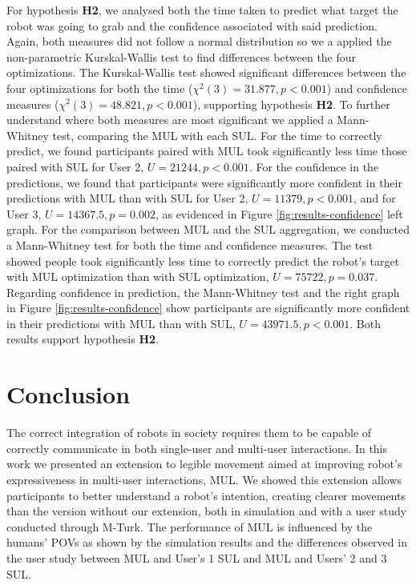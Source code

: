 \documentclass[letterpaper, 10 pt, conference]{ieeeconf}
\begin{document}
For hypothesis \textbf{H2}, we analysed both the time taken to predict what target the robot was going to grab and the confidence associated with said prediction. Again, both measures did not follow a normal distribution so we a applied the non-parametric Kurskal-Wallis test to find differences between the four optimizations. The Kurskal-Wallis test showed significant differences between the four optimizations for both the time ($\chi^2(3)=31.877, p<0.001$) and confidence measures ($\chi^2(3)=48.821, p<0.001$), supporting hypothesis \textbf{H2}. To further understand where both measures are most significant we applied a Mann-Whitney test, comparing the \ac{MUL} with each \ac{SUL}. For the time to correctly predict, we found participants paired with \ac{MUL} took significantly less time those paired with \ac{SUL} for User 2, $U=21244, p<0.001$. For the confidence in the predictions, we found that participants were significantly more confident in their predictions with \ac{MUL} than with \ac{SUL} for User 2, $U=11379, p<0.001$, and for User 3, $U=14367.5, p=0.002$, as evidenced in Figure \ref{fig:results-confidence} left graph. For the comparison between \ac{MUL} and the \ac{SUL} aggregation, we conducted a Mann-Whitney test for both the time and confidence measures. The test showed people took significantly less time to correctly predict the robot's target with \ac{MUL} optimization than with \ac{SUL} optimization, $U=75722,p=0.037$. Regarding confidence in prediction, the Mann-Whitney test and the right graph in Figure \ref{fig:results-confidence} show participants are significantly more confident in their predictions with \ac{MUL} than with \ac{SUL}, $U=43971.5,p<0.001$. Both results support hypothesis \textbf{H2}.

\section{Conclusion} 
\label{sec:conclusion}
The correct integration of robots in society requires them to be capable of correctly communicate in both single-user and multi-user interactions. In this work we presented an extension to legible movement aimed at improving robot's expressiveness in multi-user interactions, \ac{MUL}.
We showed this extension allows participants to better understand a robot's intention, creating clearer movements than the version without our extension, both in simulation and with a user study conducted through \ac{M-Turk}. The performance of \ac{MUL} is influenced by the humans' \ac{POV}s as shown by the simulation results and the differences observed in the user study between \ac{MUL} and User's 1 \ac{SUL} and \ac{MUL} and Users' 2 and 3 \ac{SUL}.
\end{document}
